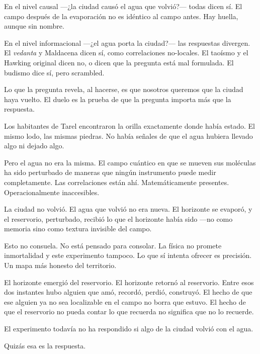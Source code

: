 En el nivel causal —¿la ciudad causó el agua que volvió?— todas dicen sí. El campo después de la evaporación no es idéntico al campo antes. Hay huella, aunque sin nombre.

En el nivel informacional —¿el agua porta la ciudad?— las respuestas divergen. El \emph{vedanta} y Maldacena dicen sí, como correlaciones no-locales. El taoísmo y el Hawking original dicen no, o dicen que la pregunta está mal formulada. El budismo dice sí, pero scrambled.

Lo que la pregunta revela, al hacerse, es que nosotros queremos que la ciudad haya vuelto. El duelo es la prueba de que la pregunta importa más que la respuesta.

\noindent Los habitantes de Tarel encontraron la orilla exactamente donde había estado. El mismo lodo, las mismas piedras. No había señales de que el agua hubiera llevado algo ni dejado algo.

Pero el agua no era la misma. El campo cuántico en que se mueven sus moléculas ha sido perturbado de maneras que ningún instrumento puede medir completamente. Las correlaciones están ahí. Matemáticamente presentes. Operacionalmente inaccesibles.

La ciudad no volvió. El agua que volvió no era nueva. El horizonte se evaporó, y el reservorio, perturbado, recibió lo que el horizonte había sido —no como memoria sino como textura invisible del campo.

Esto no consuela. No está pensado para consolar. La física no promete inmortalidad y este experimento tampoco. Lo que sí intenta ofrecer es precisión. Un mapa más honesto del territorio.

El horizonte emergió del reservorio. El horizonte retornó al reservorio. Entre esos dos instantes hubo alguien que amó, recordó, perdió, construyó. El hecho de que ese alguien ya no sea localizable en el campo no borra que estuvo. El hecho de que el reservorio no pueda contar lo que recuerda no significa que no lo recuerde.

El experimento todavía no ha respondido si algo de la ciudad volvió con el agua.

Quizás esa es la respuesta.

